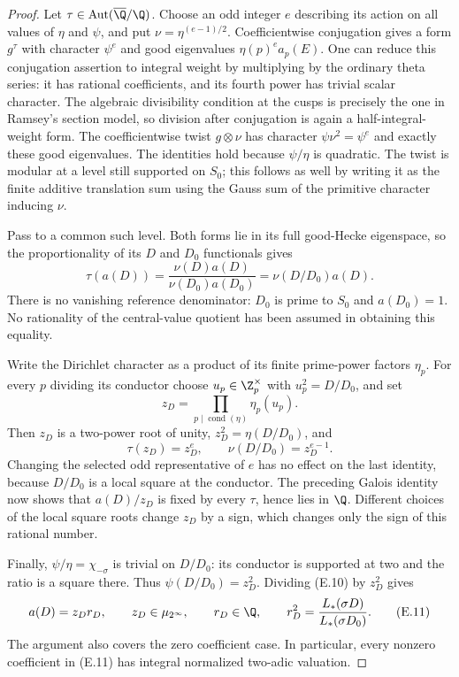 \begin{proof}
Let $\tau\in\operatorname{Aut}(\overline{\Q}/\Q)$.
Choose an odd integer $e$ describing its action on all values of
$\eta$ and $\psi$, and put $\nu=\eta^{(e-1)/2}$.
Coefficientwise conjugation gives a form $g^\tau$ with character
$\psi^e$ and good eigenvalues $\eta(p)^e a_p(E)$.
One can reduce this conjugation assertion to integral weight by
multiplying by the ordinary theta series: it has rational
coefficients, and its fourth power has trivial scalar character.
The algebraic divisibility condition at the cusps is precisely the
one in Ramsey's section model, so division after conjugation is
again a half-integral-weight form.
The coefficientwise twist $g\otimes\nu$ has character
$\psi\nu^2=\psi^e$ and exactly these good eigenvalues.
The identities hold because $\psi/\eta$ is quadratic.
The twist is modular at a level still supported on $S_0$; this
follows as well by writing it as the finite additive translation
sum using the Gauss sum of the primitive character inducing $\nu$.

Pass to a common such level. Both forms lie in its full
good-Hecke eigenspace, so the proportionality of its $D$ and $D_0$
functionals gives
\[
 \tau(a(D))
 =\frac{\nu(D)a(D)}{\nu(D_0)a(D_0)}
 =\nu(D/D_0)a(D).                                  
\]
There is no vanishing reference denominator: $D_0$ is prime to
$S_0$ and $a(D_0)=1$. No rationality of the central-value quotient
has been assumed in obtaining this equality.

Write the Dirichlet character as a product of its finite
prime-power factors $\eta_p$. For every $p$ dividing its conductor
choose $u_p\in\Z_p^\times$ with $u_p^2=D/D_0$, and set
\[
                 z_D=\prod_{p\mid\operatorname{cond}(\eta)}
                                      \eta_p(u_p).
\]
Then $z_D$ is a two-power root of unity,
$z_D^2=\eta(D/D_0)$, and
\[
 \tau(z_D)=z_D^e,\qquad
 \nu(D/D_0)=z_D^{e-1}.
\]
Changing the selected odd representative of $e$ has no effect on
the last identity, because $D/D_0$ is a local square at the
conductor. The preceding Galois identity now shows that $a(D)/z_D$ is fixed by
every $\tau$, hence lies in $\Q$.
Different choices of the local square roots change $z_D$ by a
sign, which changes only the sign of this rational number.

Finally, $\psi/\eta=\chi_{-\sigma}$ is trivial on $D/D_0$:
its conductor is supported at two and the ratio is a square there.
Thus $\psi(D/D_0)=z_D^2$. Dividing (E.10) by $z_D^2$ gives
\[
 a(D)=z_Dr_D,\qquad z_D\in\mu_{2^\infty},\qquad r_D\in\Q,
 \qquad r_D^2=\frac{L_*(\sigma D)}{L_*(\sigma D_0)}.       \tag{E.11}
\]
The argument also covers the zero coefficient case. In particular,
every nonzero coefficient in (E.11) has integral normalized
two-adic valuation.


\end{proof}
